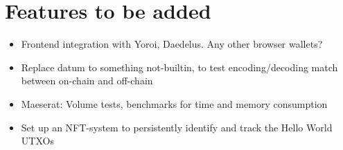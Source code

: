\documentclass{article}
\begin{document}
\section{Features to be added}

\begin{itemize}
  \item Frontend integration with Yoroi, Daedelus. Any other browser wallets?
  \item Replace datum to something not-builtin, to test encoding/decoding match
    between on-chain and off-chain
  \item Maeserat: Volume tests, benchmarks for time and memory consumption
  \item Set up an NFT-system to persistently identify and track the Hello World
    UTXOs
\end{itemize}
\end{document}
